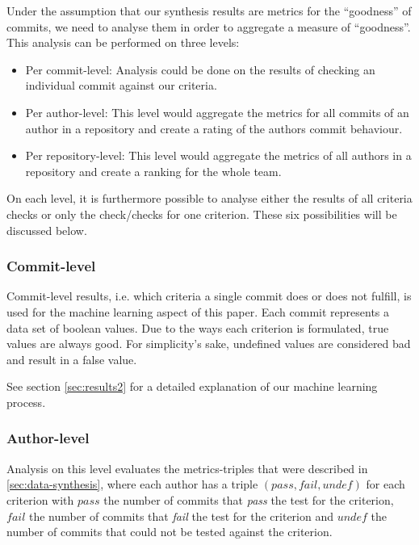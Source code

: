 
Under the assumption that our synthesis results are metrics for the ``goodness'' of commits, we need to analyse them in order to aggregate a measure of ``goodness''. This analysis can be performed on three levels:

\begin{itemize}
  \item Per commit-level: Analysis could be done on the results of checking an individual commit against our criteria.
  \item Per author-level: This level would aggregate the metrics for all commits of an author in a repository and create a rating of the authors commit behaviour.
  \item Per repository-level: This level would aggregate the metrics of all authors in a repository and create a ranking for the whole team.
\end{itemize}

On each level, it is furthermore possible to analyse either the results of all criteria checks or only the check/checks for one criterion. These six possibilities will be discussed below.

\subsubsection{Commit-level}
\label{subs:Commit-level}
Commit-level results, i.e. which criteria a single commit does or does not fulfill, is used for the machine learning aspect of this paper. Each commit represents a data set of boolean values. Due to the ways each criterion is formulated, true values are always good. For simplicity's sake, undefined values are considered bad and result in a false value.

See section \ref{sec:results2} for a detailed explanation of our machine learning process.

\subsubsection{Author-level}
\label{subs:Author-level}
Analysis on this level evaluates the metrics-triples that were described in \ref{sec:data-synthesis}, where each author has a triple $(pass, fail, undef)$ for each criterion with $pass$ the number of commits that \emph{pass} the test for the criterion, $fail$ the number of commits that \emph{fail} the test for the criterion and $undef$ the number of commits that could not be tested against the criterion.


